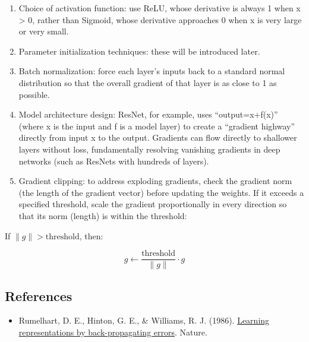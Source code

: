 \begin{enumerate}
\def\labelenumi{\arabic{enumi}.}
\item
  Choice of activation function: use ReLU, whose derivative is always 1 when x \textgreater{} 0, rather than Sigmoid, whose derivative approaches 0 when x is very large or very small.
\item
  Parameter initialization techniques: these will be introduced later.
\item
  Batch normalization: force each layer's inputs back to a standard normal distribution so that the overall gradient of that layer is as close to 1 as possible.
\item
  Model architecture design: ResNet, for example, uses ``output=x+f(x)'' (where x is the input and f is a model layer) to create a ``gradient highway'' directly from input x to the output. Gradients can flow directly to shallower layers without loss, fundamentally resolving vanishing gradients in deep networks (such as ResNets with hundreds of layers).
\item
  Gradient clipping: to address exploding gradients, check the gradient norm (the length of the gradient vector) before updating the weights. If it exceeds a specified threshold, scale the gradient proportionally in every direction so that its norm (length) is within the threshold:
\end{enumerate}

If \(\lVert g\rVert > \text{threshold}\), then:

\[
g\leftarrow \frac{\text{threshold}}{\lVert g\rVert}\cdot g
\]

\FloatBarrier
{}
\hypertarget{references-2}{%
\subsection{References}\label{references-2}}

\vspace{0.25em}
\begin{itemize}
\tightlist
\item
  Rumelhart, D. E., Hinton, G. E., \& Williams, R. J. (1986). \href{https://doi.org/10.1038/323533a0}{Learning representations by back-propagating errors}. Nature.
\end{itemize}

\clearpage
